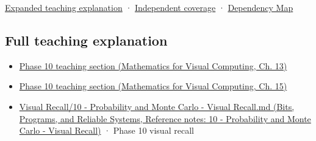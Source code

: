 \hypertarget{appendix-4192b2bdd21e-source-and-navigation}{}

\hyperref[04-visual-computing-ii-ch042-multiresolution-work-must-preserve-the-right-information]{Expanded teaching explanation} · \hyperref[appendix-fd090d982a15-xr01---independent-seeing-and-representation-source]{Independent coverage} · \hyperref[appendix-4ad47bdd269a]{Dependency Map}

\subsection{Full teaching explanation}\label{appendix-4192b2bdd21e-full-teaching-explanation}

\hypertarget{appendix-4192b2bdd21e-full-teaching-explanation}{}

\begin{itemize}
\tightlist
\item
  \href{../02-Mathematics-for-Visual-Computing/main.pdf\#nameddest=02-foundations-ii-ch029-a-computer-produces-deterministic-pseudorandom-sequences}{Phase 10 teaching section (Mathematics for Visual Computing, Ch. 13)}
\item
  \href{../02-Mathematics-for-Visual-Computing/main.pdf\#nameddest=02-foundations-ii-ch031-use-probability-to-evaluate-graphics-and-research-claims}{Phase 10 teaching section (Mathematics for Visual Computing, Ch. 15)}
\item
  \href{../01-Bits-Programs-and-Reliable-Systems/main.pdf\#nameddest=appendix-cb5af353ef77}{Visual Recall/10 - Probability and Monte Carlo - Visual Recall.md (Bits, Programs, and Reliable Systems, Reference notes: 10 - Probability and Monte Carlo - Visual Recall)} · Phase 10 visual recall
\end{itemize}
